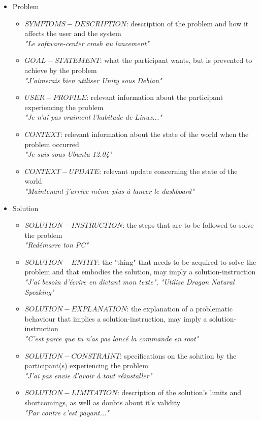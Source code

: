\begin{itemize}
	\item Problem
		\begin{itemize}
			\item $SYMPTOMS-DESCRIPTION$: description of the problem and how it affects the user and the system\\
			\textit{"Le software-center crash au lancement"}
			\item $GOAL-STATEMENT$: what the participant wants, but is prevented to achieve by the problem\\
			\textit{"J'aimerais bien utiliser Unity sous Debian"}
			\item $USER-PROFILE$: relevant information about the participant experiencing the problem\\
			\textit{"Je n'ai pas vraiment l'habitude de Linux..."}
			\item $CONTEXT$: relevant information about the state of the world when the problem occurred\\
			\textit{"Je suis sous Ubuntu 12.04"}
			\item $CONTEXT-UPDATE$: relevant update concerning the state of the world\\
			\textit{"Maintenant j'arrive même plus à lancer le dashboard"}
		\end{itemize}
	\item Solution
		\begin{itemize}
			\item $SOLUTION-INSTRUCTION$: the steps that are to be followed to solve the problem\\
			\textit{"Redémarre ton PC"}
			\item $SOLUTION-ENTITY$: the "thing" that needs to be acquired to solve the problem and that embodies the solution, may imply a solution-instruction\\
			\textit{"J'ai besoin d'écrire en dictant mon texte", "Utilise Dragon Natural Speaking"}\\
			\item $SOLUTION-EXPLANATION$: the explanation of a problematic behaviour that implies a solution-instruction, may imply a solution-instruction\\
			\textit{"C'est parce que tu n'as pas lancé la commande en root"}\\
			\item $SOLUTION-CONSTRAINT$: specifications on the solution by the participant(s) experiencing the problem\\
			\textit{"J'ai pas envie d'avoir à tout réinstaller"}
			\item $SOLUTION-LIMITATION$: description of the solution's limits and shortcomings, as well as doubts about it's validity\\
			\textit{"Par contre c'est payant..."}
		\end{itemize}
\end{itemize}

